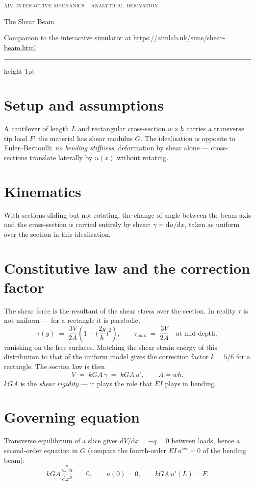\documentclass[10pt,a4paper]{article}
\begin{document}
{\footnotesize\textcolor{celdark}{\textsc{aim interactive mechanics \,\textperiodcentered\, analytical derivation}}}

{\LARGE The Shear Beam}

\textcolor{celdark}{\small Companion to the interactive simulator at
\url{https://aimlab.uk/sims/shear-beam.html}}

\medskip
{\color{celline}\hrule height 1pt}

\section*{Setup and assumptions}
A cantilever of length $L$ and rectangular cross-section $w \times h$ carries a
transverse tip load $F$; the material has shear modulus $G$. The idealisation is
opposite to Euler--Bernoulli: \emph{no bending stiffness}, deformation by shear
alone --- cross-sections translate laterally by $u(x)$ without rotating.

\section*{Kinematics}
With sections sliding but not rotating, the change of angle between the beam axis
and the cross-section is carried entirely by shear:
$\gamma = \mathrm{d}u/\mathrm{d}x$, taken as uniform over the section in this
idealisation.

\section*{Constitutive law and the correction factor}
The shear force is the resultant of the shear stress over the section. In
reality $\tau$ is not uniform --- for a rectangle it is parabolic,
\begin{equation}
\tau(y) \;=\; \frac{3V}{2A}\left(1 - \Big(\frac{2y}{h}\Big)^{\!2}\right),
\qquad
\tau_{\max} \;=\; \frac{3V}{2A} \quad \text{at mid-depth},
\end{equation}
vanishing on the free surfaces. Matching the shear strain energy of this
distribution to that of the uniform model gives the correction factor $k = 5/6$
for a rectangle. The section law is then
\begin{equation}
V \;=\; k G A \,\gamma \;=\; k G A \,u',
\qquad
A = w h .
\end{equation}
$kGA$ is the \emph{shear rigidity} --- it plays the role that $EI$ plays in
bending.

\section*{Governing equation}
Transverse equilibrium of a slice gives $\mathrm{d}V/\mathrm{d}x = -q = 0$
between loads, hence a second-order equation in $G$ (compare the fourth-order
$EI\,u'''' = 0$ of the bending beam):
\begin{equation}
k G A \,\frac{\mathrm{d}^2 u}{\mathrm{d}x^2} \;=\; 0,
\qquad
u(0) = 0, \qquad k G A\, u'(L) = F .
\end{equation}
\end{document}

